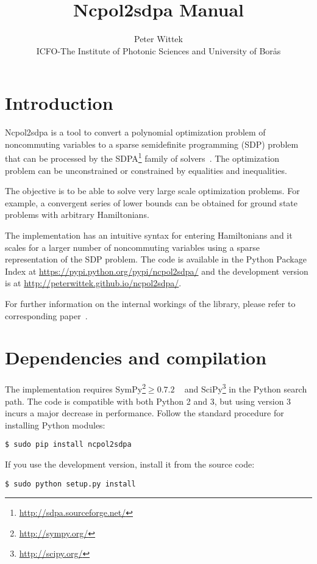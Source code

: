 \documentclass{article}
\title{Ncpol2sdpa Manual}
\author{Peter Wittek\\
        \small{ICFO-The Institute of Photonic Sciences and University of Bor\aa{}s}
}
\date{}
\begin{document}
\maketitle

\section{Introduction}
Ncpol2sdpa is a tool to convert a polynomial optimization problem of noncommuting variables to a sparse semidefinite programming (SDP) problem that can be processed by the SDPA\footnote{\url{http://sdpa.sourceforge.net/}} family of solvers~\cite{yamashita2003sdpara}. The optimization problem can be unconstrained or constrained by equalities and inequalities.

The objective is to be able to solve very large scale optimization problems. For example, a convergent series of lower bounds can be obtained for ground state problems with arbitrary Hamiltonians.

The implementation has an intuitive syntax for entering Hamiltonians and it scales for a larger number of noncommuting variables using a sparse representation of the SDP problem. The code is available in the Python Package Index at \url{https://pypi.python.org/pypi/ncpol2sdpa/} and the development version is at \url{http://peterwittek.github.io/ncpol2sdpa/}.

For further information on the internal workings of the library, please refer to corresponding paper~\citep{wittek2014ncpol2sdpa}.

\section{Dependencies and compilation}
The implementation requires SymPy\footnote{\url{http://sympy.org/}}$\geq0.7.2$ ~\citep{joyner2012open} and SciPy\footnote{\url{http://scipy.org/}} in the Python search path. The code is compatible with both Python 2 and 3, but using version 3 incurs a major decrease in performance. Follow the standard procedure for installing Python modules:
\begin{verbatim}
$ sudo pip install ncpol2sdpa
\end{verbatim}
If you use the development version, install it from the source code:
\begin{verbatim}
$ sudo python setup.py install
\end{verbatim}
\end{document}
